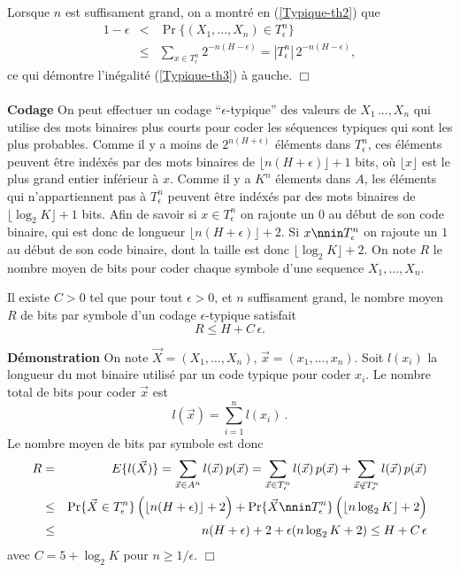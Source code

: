 Lorsque $n$ est suffisament grand, on a montr\'e en
(\ref{Typique-th2}) que
\begin{eqnarray*}
1 - \epsilon & < &\Pr \{(X_1, ...,X_n) \in T^n_\epsilon \} \\
& \leq & \sum_{x \in T^n_\epsilon} 2^{-n(H-\epsilon)} =
|T^n_\epsilon| \, 2^{-n(H-\epsilon)} ,
\end{eqnarray*} 
ce qui d\'emontre l'in\'egalit\'e (\ref{Typique-th3})
\`a gauche.
$\Box$
\\
\\
{\bf Codage} On peut effectuer un codage ``$\epsilon$-typique'' des
valeurs de $X_1\,...,X_n$ qui utilise des mots binaires plus courts
pour coder les s\'equences typiques qui sont les plus probables.
Comme il y a moins de $2^{n(H+\epsilon)}$ \'el\'ements 
dans $T^n_\epsilon$, ces \'el\'ements peuvent \^etre ind\'ex\'es
par des mots binaires de $\lfloor n(H+\epsilon)\rfloor + 1$
bits, o\`u  $\lfloor x \rfloor$ est le plus grand entier inf\'erieur
\`a $x$.
Comme il y a $K^n$ \'elements dans $A$, les \'el\'ements
qui n'appartiennent pas \`a $T^n_\epsilon$ peuvent \^etre
ind\'ex\'es par des mots binaires de
$\lfloor \log_2 K \rfloor + 1$ bits. Afin de savoir si
$x \in T^n_\epsilon$ on rajoute 
un $0$ au d\'ebut de son code binaire, qui est donc de longueur
$\lfloor n(H+\epsilon)\rfloor + 2$. Si $x \nnin T^n_\epsilon$ 
on rajoute un $1$ au d\'ebut de son code binaire, dont la
taille est donc $\lfloor \log_2 K \rfloor + 2$.
On note $R$ le nombre moyen de bits pour coder chaque
symbole d'une sequence $X_1, ... , X_n$. 


\begin{theorem}
Il existe $C > 0$ tel que pour tout
$\epsilon > 0$, et $n$ suffisament grand, 
le nombre moyen $R$ de bits par symbole d'un
codage $\epsilon$-typique satisfait
\[
R \leq H + C\, \epsilon .
\]
\end{theorem}

{\bf D\'emonstration} On note $\vec X = (X_1 , ... , X_n )$, 
$\vec x = (x_1 , ... , x_n )$. Soit $l(x_i)$ la longueur du
mot binaire utilis\'e par un code typique pour coder $x_i$. 
Le nombre total de bits pour coder $\vec x$ est
\[
l(\vec x) = \sum_{i=1}^n l(x_i)~.
\]
Le nombre moyen de bits par symbole est donc
\begin{eqnarray*}
R &=& E \{ l(\vec X)\} = 
\sum_{\vec x \in A^n} l(\vec x)\, p(\vec x) =
\sum_{\vec x \in T^n_\epsilon} l(\vec x)\, p(\vec x) +
\sum_{\vec x \nin T^n_\epsilon} l(\vec x)\, p(\vec x) \\
&\leq& \Pr \{\vec X \in T^n_\epsilon \}\, 
\Bigl(\lfloor n(H+\epsilon)
\rfloor + 2\Bigr)
+ \Pr \{\vec X \nnin T^n_\epsilon \}\, 
\Bigl( \lfloor n \log_2 K \rfloor +
2\Bigr) \\
&\leq& n(H+\epsilon) + 2 + \epsilon ( n \log_2 K + 2) \leq
 H + C\, \epsilon
\end{eqnarray*}
avec $C = 5 + \log_2 K $ pour $n \geq 1/\epsilon$.
$\Box$

